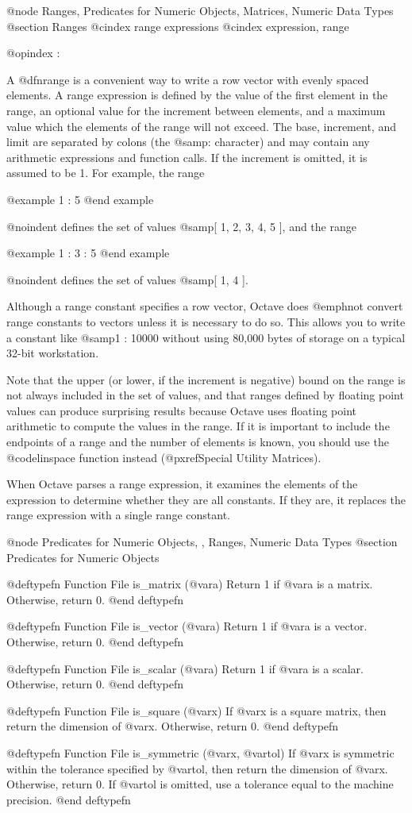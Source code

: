 @node Ranges, Predicates for Numeric Objects, Matrices, Numeric Data Types
@section Ranges
@cindex range expressions
@cindex expression, range

@opindex :

A @dfn{range} is a convenient way to write a row vector with evenly
spaced elements.  A range expression is defined by the value of the first
element in the range, an optional value for the increment between
elements, and a maximum value which the elements of the range will not
exceed.  The base, increment, and limit are separated by colons (the
@samp{:} character) and may contain any arithmetic expressions and
function calls.  If the increment is omitted, it is assumed to be 1.
For example, the range

@example
1 : 5
@end example

@noindent
defines the set of values @samp{[ 1, 2, 3, 4, 5 ]}, and the range

@example
1 : 3 : 5
@end example

@noindent
defines the set of values @samp{[ 1, 4 ]}.

Although a range constant specifies a row vector, Octave does @emph{not}
convert range constants to vectors unless it is necessary to do so.
This allows you to write a constant like @samp{1 : 10000} without using
80,000 bytes of storage on a typical 32-bit workstation.

Note that the upper (or lower, if the increment is negative) bound on
the range is not always included in the set of values, and that ranges
defined by floating point values can produce surprising results because
Octave uses floating point arithmetic to compute the values in the
range.  If it is important to include the endpoints of a range and the
number of elements is known, you should use the @code{linspace} function
instead (@pxref{Special Utility Matrices}).

When Octave parses a range expression, it examines the elements of the
expression to determine whether they are all constants.  If they are, it
replaces the range expression with a single range constant.

@node Predicates for Numeric Objects,  , Ranges, Numeric Data Types
@section Predicates for Numeric Objects

@deftypefn {Function File} {} is_matrix (@var{a})
Return 1 if @var{a} is a matrix.  Otherwise, return 0.
@end deftypefn

@deftypefn {Function File} {} is_vector (@var{a})
Return 1 if @var{a} is a vector.  Otherwise, return 0.
@end deftypefn

@deftypefn {Function File} {} is_scalar (@var{a})
Return 1 if @var{a} is a scalar.  Otherwise, return 0.
@end deftypefn

@deftypefn {Function File} {} is_square (@var{x})
If @var{x} is a square matrix, then return the dimension of @var{x}.
Otherwise, return 0.
@end deftypefn

@deftypefn {Function File} {} is_symmetric (@var{x}, @var{tol})
If @var{x} is symmetric within the tolerance specified by @var{tol}, 
then return the dimension of @var{x}.  Otherwise, return 0.  If
@var{tol} is omitted, use a tolerance equal to the machine precision.
@end deftypefn
